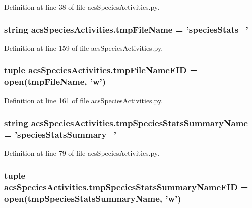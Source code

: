Definition at line 38 of file acs\-Species\-Activities.\-py.

\hypertarget{a00097_a23844a8104156ee329f8c957f11490f4}{
\subsubsection[{tmp\-File\-Name}]{\setlength{\rightskip}{0pt plus 5cm}string acs\-Species\-Activities.\-tmp\-File\-Name = 'species\-Stats\-\_\-'}}\label{a00097_a23844a8104156ee329f8c957f11490f4}


Definition at line 159 of file acs\-Species\-Activities.\-py.

\hypertarget{a00097_addb867cf8533f2e18682c49f08f47bba}{
\subsubsection[{tmp\-File\-Name\-F\-I\-D}]{\setlength{\rightskip}{0pt plus 5cm}tuple acs\-Species\-Activities.\-tmp\-File\-Name\-F\-I\-D = open({\bf tmp\-File\-Name}, 'w')}}\label{a00097_addb867cf8533f2e18682c49f08f47bba}


Definition at line 161 of file acs\-Species\-Activities.\-py.

\hypertarget{a00097_aceab16acbf85893dcacfcfd921c9da12}{
\subsubsection[{tmp\-Species\-Stats\-Summary\-Name}]{\setlength{\rightskip}{0pt plus 5cm}string acs\-Species\-Activities.\-tmp\-Species\-Stats\-Summary\-Name = 'species\-Stats\-Summary\-\_\-'}}\label{a00097_aceab16acbf85893dcacfcfd921c9da12}


Definition at line 79 of file acs\-Species\-Activities.\-py.

\hypertarget{a00097_a57b362cf15dda461a59c719a92177c3a}{
\subsubsection[{tmp\-Species\-Stats\-Summary\-Name\-F\-I\-D}]{\setlength{\rightskip}{0pt plus 5cm}tuple acs\-Species\-Activities.\-tmp\-Species\-Stats\-Summary\-Name\-F\-I\-D = open({\bf tmp\-Species\-Stats\-Summary\-Name}, 'w')}}\label{a00097_a57b362cf15dda461a59c719a92177c3a}


